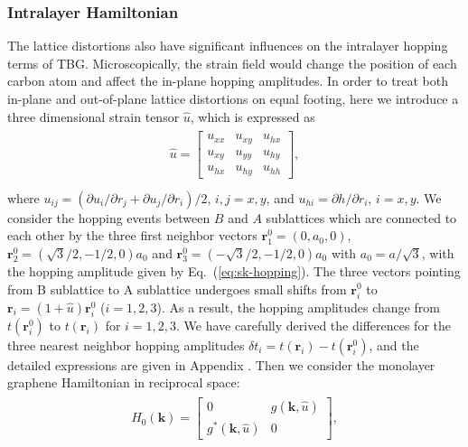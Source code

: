 \documentclass[aps,prx,10pt,twocolumn,superscriptaddress]{revtex4}
\def\V{{\uppercase\expandafter{\romannumeral 5}}}
\begin{document}
\subsubsection{Intralayer Hamiltonian}
The lattice distortions also have significant influences on the intralayer hopping terms of TBG. Microscopically, the  strain field would change the position of each carbon atom and affect the in-plane hopping amplitudes.
In order to treat both in-plane and out-of-plane lattice distortions on equal footing, here we  introduce a three dimensional strain tensor $\hat{u}$, which is expressed as
\begin{align}\label{strain}
\begin{split}
\hat{u}=\left[\begin{array}{ccc}
				u_{xx} & u_{xy} & u_{hx} \\
				u_{xy} & u_{yy} & u_{hy} \\
				u_{hx} & u_{hy} & u_{hh}
\end{array}\right],\\
\end{split}
\end{align}
 where $u_{ij}\!=\!(\partial u_{i}/\partial r_j + \partial u_{j}/\partial r_i)/2$, $i,j\!=\!x, y$, and $u_{hi}\!=\!\partial h/\partial r_i$, $i\!=\!x, y$. We consider the hopping events between $B$ and $A$ sublattices which are connected to each other by the three first neighbor vectors  $\textbf{r}^{0}_{1}\!=\!(0,a_{0},0)$, $\textbf{r}^{0}_{2}\!=\!(\sqrt{3}/2,-1/2,0)a_{0}$ and $\textbf{r}^{0}_{3}\!=\!(-\sqrt{3}/2,-1/2,0)a_{0}$ with $a_{0}\!=\!a/\sqrt{3}$, with the hopping amplitude given by Eq.~(\ref{eq:sk-hopping}).
The three vectors pointing from B sublattice to A sublattice undergoes small shifts from $\textbf{r}^{0}_{i}$ to $\textbf{r}_{i}\!=\!(1+\hat{u})\textbf{r}^{0}_{i}$ ($i=1, 2, 3$). As a result, the hopping amplitudes change from $t(\textbf{r}^{0}_{i})$ to $t(\textbf{r}_{i})$ for $i=1, 2, 3$. We have carefully derived the differences for the three nearest neighbor hopping amplitudes $\delta t_i=t(\textbf{r}_{i})-t(\textbf{r}_{i}^{0})$, and the detailed expressions are given in Appendix \V. Then we consider the monolayer graphene Hamiltonian in reciprocal space:
\begin{align}\label{strain}
\begin{split}
H_0(\mathbf{k})=\left[\begin{array}{cc}
				0 & g(\textbf{k},\hat{u})  \\
				g^{*}(\textbf{k},\hat{u}) & 0
\end{array}\right],\\
\end{split}
\end{align}
\end{document}
